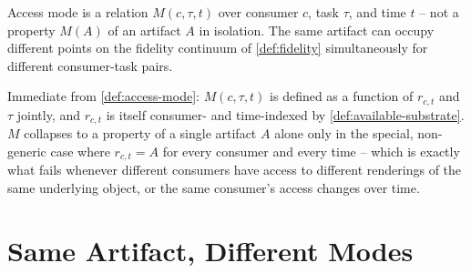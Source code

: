 \begin{proposition}
\label{prop:mode-relation}
Access mode is a relation $M(c, \tau, t)$ over consumer $c$, task $\tau$,
and time $t$ -- not a property $M(A)$ of an artifact $A$ in isolation.
The same artifact can occupy different points on the fidelity continuum
of \cref{def:fidelity} simultaneously for different consumer-task pairs.
\end{proposition}

\begin{proofsketch}
Immediate from \cref{def:access-mode}: $M(c,\tau,t)$ is defined as a
function of $r_{c,t}$ and $\tau$ jointly, and $r_{c,t}$ is itself
consumer- and time-indexed by \cref{def:available-substrate}. $M$
collapses to a property of a single artifact $A$ alone only in the
special, non-generic case where $r_{c,t} = A$ for every consumer and
every time -- which is exactly what fails whenever different consumers
have access to different renderings of the same underlying object, or
the same consumer's access changes over time.
\end{proofsketch}

\section{Same Artifact, Different Modes}

